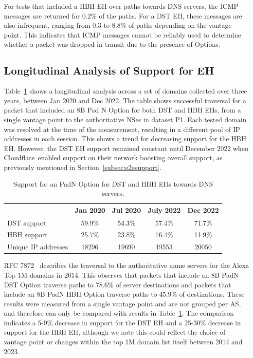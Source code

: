 \documentclass[conference]{IEEEtran}
\begin{document}
For tests that included a
HBH EH over paths towards DNS servers, the ICMP messages
are returned for 0.2\% of the paths. For a DST EH, these messages
are also infrequent, ranging from 0.3 to 8.8\% of paths depending on the
vantage point. 
This indicates that ICMP messages cannot be reliably used to
determine whether a packet was dropped in transit due to the presence of Options.



\subsection{Longitudinal Analysis of Support for EH}

Table~\ref{tbl:longitudinal_support} shows a longitudinal analysis
across a set of domains collected over three years,  between Jan 2020 and
Dec 2022.  The table shows successful traversal for a packet that included an 8B Pad N Option for both DST and
HBH EHs, from a single vantage point to the authoritative NSes in dataset P1.
Each tested domain was resolved at the time of the measurement, resulting in a
different pool of IP addresses in each session. 
This shows a trend for decreasing support for the HBH EH. However, the DST EH support
remained constant until December 2022 when Cloudflare\texttrademark\ enabled support on
their network boosting  overall support, as previously
mentioned in Section~\ref{subsec:e2esupport}.

\begin{table}
\caption{Support for an PadN Option for DST and HBH EHs towards DNS servers.}
\begin{tabular}{l|c|c|c|c}
              & Jan 2020 & Jul 2020 & July 2022 & Dec 2022 \\
\hline \hline
DST support   & 59.9\%   & 54.3\%   & 57.4\%    & 71.7\%   \\
HBH support   & 25.7\%   & 23.8\%   & 16.4\%    & 11.9\%   \\
\hline
Unique IP addresses & 18296    & 19690    & 19553     & 20050   
\end{tabular}
\label{tbl:longitudinal_support}
\end{table}


RFC 7872~\cite{RFC7872} describes the traversal to the authoritative name servers for the Alexa Top 1M domains in 2014. This observes that packets that include an 8B PadN DST Option traverse paths to 78.6\% of server destinations and packets that include an 8B PadN HBH Option traverse paths to 45.9\% of destinations. These results were measured from a single vantage point and are not grouped per AS, and therefore can only be compared with results in Table~\ref{tbl:longitudinal_support}. The comparison indicates a 5-9\% decrease in support for the DST EH and a 25-30\% decrease in support for the HBH EH, although we note this could reflect the choice of vantage point or changes within the top 1M domain list itself between 2014 and 2023.
\end{document}
